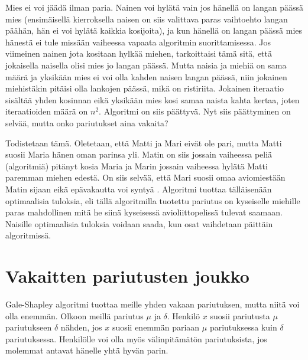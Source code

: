 \documentclass[finnish]{tktltiki2}
\theoremstyle{definition}
\theoremstyle{remark}
\begin{document}
Mies ei voi jäädä ilman paria. Nainen voi hylätä vain jos hänellä on langan päässä mies (ensimäisellä kierroksella naisen on siis valittava paras vaihtoehto langan päähän, hän ei voi hylätä kaikkia kosijoita), ja kun hänellä on langan päässä mies hänestä ei tule missään vaiheessa vapaata algoritmin suorittamisessa.
Jos viimeinen nainen jota kositaan hylkää miehen, tarkoittaisi tämä sitä, että jokaisella naisella olisi mies jo langan päässä. Mutta naisia ja miehiä on sama määrä ja yksikään mies ei voi olla kahden naisen langan päässä, niin jokainen miehistäkin pitäisi olla lankojen päässä, mikä on ristiriita.
Jokainen iteraatio sisältää yhden kosinnan eikä yksikään mies kosi samaa naista kahta kertaa, joten iteraatioiden määrä on $n^2$. Algoritmi on siis päättyvä. Nyt siis päättyminen on selvää, mutta onko pariutukset aina vakaita?

Todistetaan tämä. Oletetaan, että Matti ja Mari eivät ole pari, mutta Matti suosii Maria hänen oman parinsa yli. Matin on siis jossain vaiheessa peliä (algoritmiä) pitänyt kosia Maria ja Marin jossain vaiheessa hylätä Matti paremman miehen edestä. On siis selvää, että Mari suosii omaa aviomiestään Matin sijaan eikä epävakautta voi syntyä \cite[p. 588]{gale62a}.
Algoritmi tuottaa tälläisenään optimaalisia tuloksia, eli tällä algoritmilla tuotettu pariutus on kyseiselle miehille paras mahdollinen mitä he siinä kyseisessä avioliittopelissä tulevat saamaan.
Naisille optimaalisia tuloksia voidaan saada, kun osat vaihdetaan päittäin algoritmissä.

\section{Vakaitten pariutusten joukko}
Gale-Shapley algoritmi tuottaa meille yhden vakaan pariutuksen, mutta niitä voi olla enemmän.
Olkoon meillä pariutus $\mu$ ja $\delta$. Henkilö $x$ suosii pariutusta $\mu$ pariutukseen $\delta$ nähden, jos $x$ suosii enemmän pariaan $\mu$ pariutuksessa kuin $\delta$ pariutuksessa. Henkilölle voi olla myös välinpitämätön pariutuksista, jos molemmat antavat hänelle yhtä hyvän parin.
\end{document}
